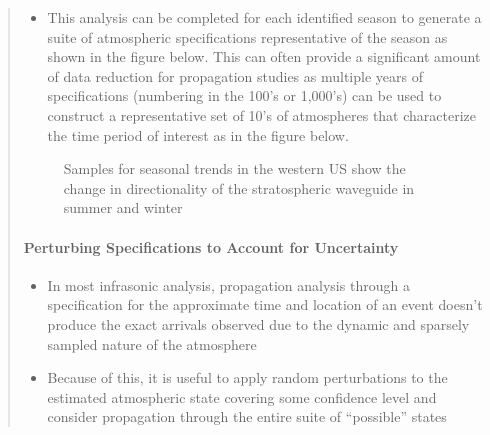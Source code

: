 \documentclass[letterpaper,10pt,english]{sphinxmanual}
\let\sphinxpxdimen\pdfpxdimen\else\newdimen\sphinxpxdimen
\begin{document}
\begin{itemize}
\begin{quote}
\begin{sphinxVerbatim}[commandchars=\\\{\}]
   
  
\end{sphinxVerbatim}
\begin{itemize}
\item {} 
\sphinxAtStartPar
This analysis can be completed for each identified season to generate a suite of atmospheric specifications representative of the season as shown in the figure below.  This can often provide a significant amount of data reduction for propagation studies as multiple years of specifications (numbering in the 100’s or 1,000’s) can be used to construct a representative set of 10’s of atmospheres that characterize the time period of interest as in the figure below.

\end{itemize}

\begin{figure}[htbp]
\centering
\capstart

\noindent\sphinxincludegraphics[width=500\sphinxpxdimen]{{US_RM-samples}.png}
\caption{Samples for seasonal trends in the western US show the change in directionality of the stratospheric waveguide in summer and winter}\label{\detokenize{sampling:id2}}\end{figure}


\paragraph{Perturbing Specifications to Account for Uncertainty}
\label{\detokenize{sampling:perturbing-specifications-to-account-for-uncertainty}}\begin{itemize}
\item {} 
\sphinxAtStartPar
In most infrasonic analysis, propagation analysis through a specification for the approximate time and location of an event doesn’t produce the exact arrivals observed due to the dynamic and sparsely sampled nature of the atmosphere

\item {} 
\sphinxAtStartPar
Because of this, it is useful to apply random perturbations to the estimated atmospheric state covering some confidence level and consider propagation through the entire suite of “possible” states


\end{itemize}
\end{quote}
\end{itemize}
\end{document}
